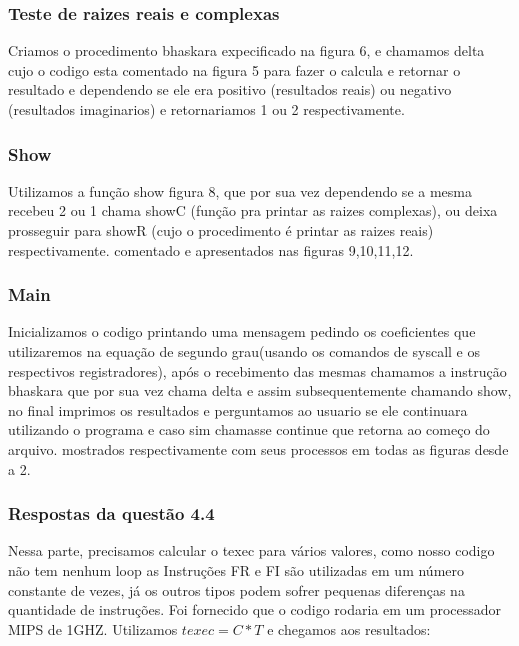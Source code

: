 \documentclass[12pt]{article}
\begin{document}
\subsubsection{Teste de raizes reais e complexas}
\label{subsubsec:testebhas}

Criamos o procedimento bhaskara expecificado na figura 6, e chamamos delta cujo o codigo esta comentado na figura 5 para fazer o calcula e retornar o resultado e dependendo se ele era positivo (resultados reais) ou negativo (resultados imaginarios) e retornariamos 1 ou 2 respectivamente. 

\subsubsection{Show}
\label{subsubsec:show}

Utilizamos a função show figura 8, que por sua vez dependendo se a mesma recebeu 2 ou 1 chama showC (função pra printar as raizes complexas), ou deixa prosseguir para showR (cujo o procedimento é printar as raizes reais) respectivamente. comentado e apresentados nas figuras 9,10,11,12. 

\subsubsection{Main}
\label{subsubsec:Main}

Inicializamos o codigo printando uma mensagem pedindo os coeficientes que utilizaremos na equação de segundo grau(usando os comandos de syscall e os respectivos registradores), após o recebimento das mesmas chamamos a instrução bhaskara que por sua vez chama delta e assim subsequentemente chamando show, no final imprimos os resultados e perguntamos ao usuario se ele continuara utilizando o programa e caso sim chamasse continue que retorna ao começo do arquivo. mostrados respectivamente com seus processos em todas as figuras desde a 2.
 
	

\subsubsection{Respostas da questão 4.4}
\label{subsubsec:4.4}
Nessa parte, precisamos calcular o texec para vários valores, como nosso codigo não tem nenhum loop as Instruções FR e FI são utilizadas em um número constante de vezes, já os outros tipos podem sofrer pequenas diferenças na quantidade de instruções. Foi fornecido que o codigo rodaria em um processador MIPS de 1GHZ. Utilizamos \(texec= C * T\) e chegamos aos resultados:
\end{document}
